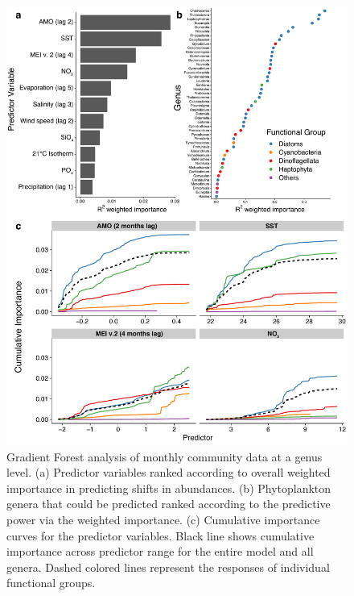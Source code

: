 \documentclass[draft]{agujournal2019}
\begin{document}
    \begin{figure}
    \noindent\includegraphics[width=\textwidth]{fig/Figure6_GF_output_FINAL_v2.pdf}
    \caption{Gradient Forest analysis of monthly community data at a genus level. (a) Predictor variables ranked according to overall weighted importance in predicting shifts in abundances. (b) Phytoplankton genera that could be predicted ranked according to the predictive power via the weighted importance. (c) Cumulative importance curves for the predictor variables. Black line shows cumulative importance across predictor range for the entire model and all genera. Dashed colored lines represent the responses of individual functional groups.}
    \label{fig:GF}
    \end{figure}
    
\end{document}
